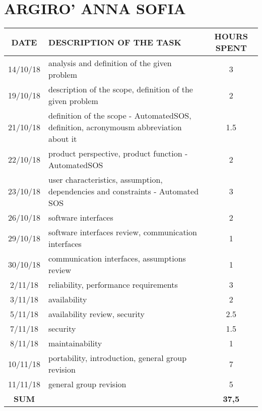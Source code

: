 \section{ARGIRO' ANNA SOFIA}
\begin{table}[h!]
\begin{tabular}{|c|p{3in}|c|}
\hline
\textbf{DATE} &\textbf{DESCRIPTION OF THE TASK} & \textbf{HOURS SPENT}\\
\hline
14/10/18 & analysis and definition of the given problem & 3\\
\hline
19/10/18 & description of the scope, definition of the given problem & 2\\
\hline
21/10/18 & definition of the scope - AutomatedSOS, definition, acronymousm abbreviation about it& 1.5\\
\hline
22/10/18 & product perspective, product function - AutomatedSOS & 2\\
\hline
23/10/18 & user characteristics, assumption, dependencies and constraints - Automated SOS  & 3\\
\hline
26/10/18 & software interfaces & 2\\
\hline
29/10/18 & software interfaces review, communication interfaces & 1\\
\hline
30/10/18 & communication interfaces, assumptions review & 1\\
\hline
2/11/18 & reliability, performance requirements & 3\\
\hline
3/11/18 & availability & 2\\
\hline
5/11/18 & availability review, security & 2.5\\
\hline
7/11/18 & security & 1.5\\
\hline
8/11/18 & maintainability & 1\\
\hline
10/11/18 & portability, introduction, general group revision & 7\\
\hline
11/11/18 & general group revision & 5\\
\hline
\textbf{SUM} &  & 	\textbf{37,5}\\
\hline

\end{tabular}
\end{table}

\clearpage



